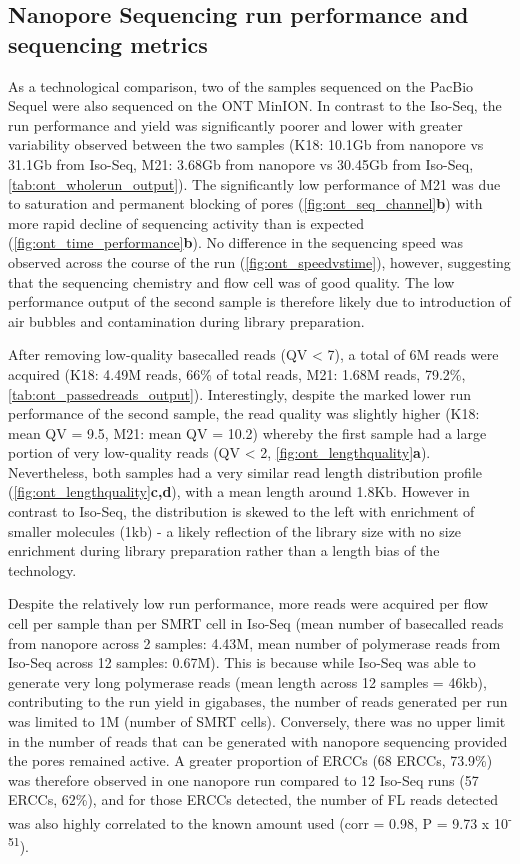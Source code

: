\subsection{Nanopore Sequencing run performance and sequencing metrics}
As a technological comparison, two of the samples sequenced on the PacBio Sequel were also sequenced on the ONT MinION. In contrast to the Iso-Seq, the run performance and yield was significantly poorer and lower with greater variability observed between the two samples (K18: 10.1Gb from nanopore vs 31.1Gb from Iso-Seq, M21: 3.68Gb from nanopore vs 30.45Gb from Iso-Seq, \cref{tab:ont_wholerun_output}). The significantly low performance of M21 was due to saturation and permanent blocking of pores (\cref{fig:ont_seq_channel}\textbf{b}) with more rapid decline of sequencing activity than is expected (\cref{fig:ont_time_performance}\textbf{b}). No difference in the sequencing speed was observed across the course of the run (\cref{fig:ont_speedvstime}), however, suggesting that the sequencing chemistry and flow cell was of good quality. The low performance output of the second sample is therefore likely due to introduction of air bubbles and contamination during library preparation.

After removing low-quality basecalled reads (QV < 7), a total of 6M reads were acquired (K18: 4.49M reads, 66\% of total reads, M21: 1.68M reads, 79.2\%, \cref{tab:ont_passedreads_output}). Interestingly, despite the marked lower run performance of the second sample, the read quality was slightly higher (K18: mean QV = 9.5, M21: mean QV = 10.2) whereby the first sample had a large portion of very low-quality reads (QV < 2, \cref{fig:ont_lengthquality}\textbf{a}). Nevertheless, both samples had a very similar read length distribution profile (\cref{fig:ont_lengthquality}\textbf{c,d}), with a mean length around 1.8Kb. However in contrast to Iso-Seq, the distribution is skewed to the left with enrichment of smaller molecules (1kb) - a likely reflection of the library size with no size enrichment during library preparation rather than a length bias of the technology. 

Despite the relatively low run performance, more reads were acquired per flow cell per sample than per SMRT cell in Iso-Seq (mean number of basecalled reads from nanopore across 2 samples: 4.43M, mean number of polymerase reads from Iso-Seq across 12 samples: 0.67M). This is because while Iso-Seq was able to generate very long polymerase reads (mean length across 12 samples = 46kb), contributing to the run yield in gigabases, the number of reads generated per run was limited to 1M (number of SMRT cells). Conversely, there was no upper limit in the number of reads that can be generated with nanopore sequencing provided the pores remained active. A greater proportion of ERCCs (68 ERCCs, 73.9\%) was therefore observed in one nanopore run compared to 12 Iso-Seq runs (57 ERCCs, 62\%), and for those ERCCs detected, the number of FL reads detected was also highly correlated to the known amount used (corr = 0.98, P = 9.73 x 10\textsuperscript{-51}). 


